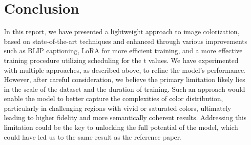 \documentclass[10pt,twocolumn,letterpaper]{article}
\begin{document}
\section{Conclusion}
In this report, we have presented a lightweight approach to image colorization, based on state-of-the-art techniques and enhanced through various improvements such as BLIP captioning, LoRA for more efficient training, and a more effective training procedure utilizing scheduling for the t values. We have experimented with multiple approaches, as described above, to refine the model's performance. However, after careful consideration, we believe the primary limitation likely lies in the scale of the dataset and the duration of training. Such an approach would enable the model to better capture the complexities of color distribution, particularly in challenging regions with vivid or saturated colors, ultimately leading to higher fidelity and more semantically coherent results. Addressing this limitation could be the key to unlocking the full potential of the model, which could have led us to the same result as the reference paper. 

\clearpage

{\small


}
\end{document}
